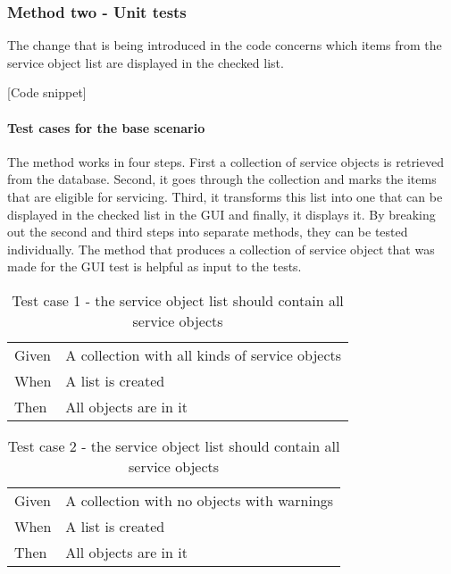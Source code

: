 \documentclass{article}
\begin{document}
			\subsubsection{Method two - Unit tests}
				The change that is being introduced in the code concerns which items from the service object list are displayed in the checked list.

				[Code snippet]
				
				\paragraph{Test cases for the base scenario} 
				The method works in four steps. First a collection of service objects is retrieved from the database.
				Second, it goes through the collection and marks the items that are eligible for servicing. Third, it transforms this list into one that can be displayed in the checked list in the GUI and finally, it displays it.
				By breaking out the second and third steps into separate methods, they can be tested individually.
				The method that produces a collection of service object that was made for the GUI test is helpful as input to the tests.

				\begin{table}[h!]
					\centering
					\begin{tabular}{|p{1cm} p{7cm} |}
					\hline
					Given 	& A collection with all kinds of service objects \\ 
					When 	& A list is created  \\	
					Then 	& All objects are in it \\
					\hline
					\end{tabular}
					\caption{Test case 1 - the service object list should contain all service objects}
				\end{table}


				\begin{table}[h!]
					\centering
					\begin{tabular}{|p{1cm} p{7cm} |}
					\hline
					Given 	& A collection with no objects with warnings\\ 
					When 	& A list is created  \\	
					Then 	& All objects are in it \\
					\hline
					\end{tabular}
					\caption{Test case 2 - the service object list should contain all service objects}
				\end{table}
\end{document}
